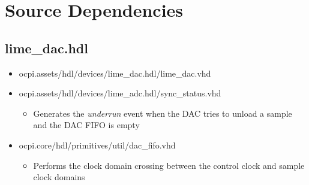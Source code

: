 \documentclass{article}
\def\comp{lime\_dac}
\begin{document}
\section*{Source Dependencies}
\subsection*{\comp.hdl}
\begin{itemize}
	\item ocpi.assets/hdl/devices/lime\_dac.hdl/lime\_dac.vhd
	\item ocpi.assets/hdl/devices/lime\_adc.hdl/sync\_status.vhd
	      \begin{itemize}
	      	\item Generates the \textit{underrun} event when the DAC tries to unload a sample and the DAC FIFO is empty
	      \end{itemize}
	\item ocpi.core/hdl/primitives/util/dac\_fifo.vhd
	      \begin{itemize}
	      	\item Performs the clock domain crossing between the control clock and sample clock domains
	      \end{itemize}
\end{itemize}
\end{document}

